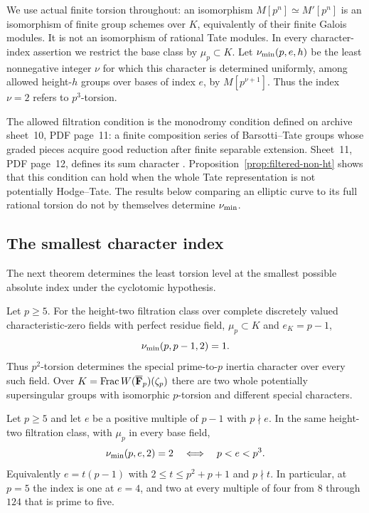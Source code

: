 We use actual finite torsion throughout: an isomorphism $M[p^n]\simeq M'[p^n]$ is an isomorphism of finite group schemes over $K$, equivalently of their finite Galois modules. It is not an isomorphism of rational Tate modules. In every character-index assertion we restrict the base class by $\mu_p\subset K$. Let $\nu_{\min}(p,e,h)$ be the least nonnegative integer $\nu$ for which this character is determined uniformly, among allowed height-$h$ groups over bases of index $e$, by $M[p^{\nu+1}]$. Thus the index $\nu=2$ refers to $p^3$-torsion.

The allowed filtration condition is the monodromy condition defined on archive sheet~10, PDF page~11: a finite composition series of Barsotti--Tate groups whose graded pieces acquire good reduction after finite separable extension. Sheet~11, PDF page~12, defines its sum character \citep[sheets~10--11]{Grothendieck1969}. Proposition~\ref{prop:filtered-non-ht} shows that this condition can hold when the whole Tate representation is not potentially Hodge--Tate. The results below comparing an elliptic curve to its full rational torsion do not by themselves determine $\nu_{\min}$.






\subsection{The smallest character index}
The next theorem determines the least torsion level at the smallest possible absolute index under the cyclotomic hypothesis.

\begin{theorem}\label{thm:minimal-index}
Let $p\ge5$. For the height-two filtration class over complete discretely valued characteristic-zero fields with perfect residue field, $\mu_p\subset K$ and $e_K=p-1$,
\[
                         \nu_{\min}(p,p-1,2)=1.
\]
Thus $p^2$-torsion determines the special prime-to-$p$ inertia character over every such field. Over $K=\operatorname{Frac}W(\overline{\mathbf F}_p)(\zeta_p)$ there are two whole potentially supersingular groups with isomorphic $p$-torsion and different special characters.
\end{theorem}

\begin{corollary}\label{cor:exact-index-two}
Let $p\ge5$ and let $e$ be a positive multiple of $p-1$ with $p\nmid e$. In the same height-two filtration class, with $\mu_p$ in every base field,
\[
              \nu_{\min}(p,e,2)=2\quad\Longleftrightarrow\quad p<e<p^3.
\]
Equivalently $e=t(p-1)$ with $2\le t\le p^2+p+1$ and $p\nmid t$. In particular, at $p=5$ the index is one at $e=4$, and two at every multiple of four from $8$ through $124$ that is prime to five.
\end{corollary}

